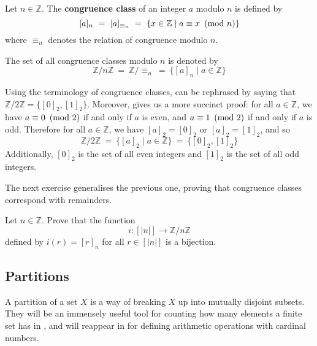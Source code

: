 \begin{definition}
\label{defCongruenceClass}
Let $n \in \mathbb{Z}$. The \textbf{congruence class} of an integer $a$ modulo $n$ is defined by
\[ [a]_n ~=~ [a]_{\equiv_n} ~=~ \{ x \in \mathbb{Z} \mid a \equiv x ~\left(\text{mod}~n\right) \} \]
where $\equiv_n$ denotes the relation of congruence modulo $n$.

The set of all congruence classes modulo $n$ is denoted by
\[ \mathbb{Z}/n\mathbb{Z} ~=~ \mathbb{Z}/{\equiv_n} ~=~ \{ [a]_n \mid a \in \mathbb{Z} \} \]
\end{definition}

\begin{example}
Using the terminology of congruence classes,  can be rephrased by saying that $\mathbb{Z}/2\mathbb{Z} = \{ [0]_2, [1]_2 \}$. Moreover,  gives us a more succinct proof: for all $a \in \mathbb{Z}$, we have $a \equiv 0 ~\left(\text{mod}~2\right)$ if and only if $a$ is even, and $a \equiv 1 ~\left(\text{mod}~2\right)$ if and only if $a$ is odd. Therefore for all $a \in \mathbb{Z}$, we have $[a]_2 = [0]_2$ or $[a]_2 = [1]_2$, and so
\[ \mathbb{Z}/2\mathbb{Z} ~=~ \{ [a]_2 \mid a \in \mathbb{Z} \} ~=~ \{ [0]_2, [1]_2 \} \]
Additionally, $[0]_2$ is the set of all even integers and $[1]_2$ is the set of all odd integers.
\end{example}

The next exercise generalises the previous one, proving that congruence classes correspond with remainders.

\begin{exercise}
\label{exCongruenceClassesCorrespondWithRemainders}
Let $n \in \mathbb{Z}$. Prove that the function
\[ i : [|n|] \to \mathbb{Z}/n\mathbb{Z} \]
defined by $i(r) = [r]_n$ for all $r \in [|n|]$ is a bijection.
\end{exercise}

\subsection*{Partitions}

A partition of a set $X$ is a way of breaking $X$ up into mutually disjoint subsets. They will be an immensely useful tool for counting how many elements a finite set has in , and will reappear in  for defining arithmetic operations with cardinal numbers.

